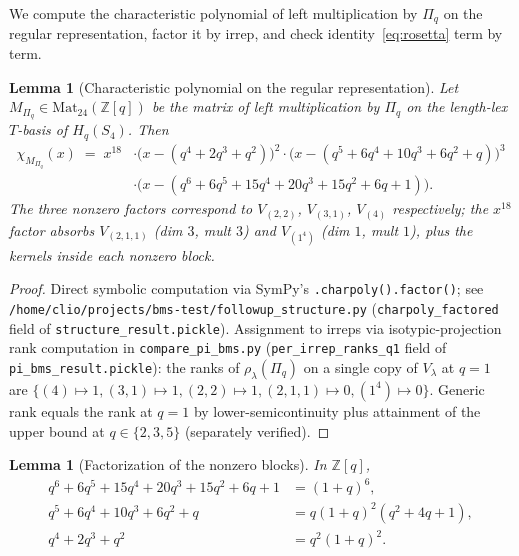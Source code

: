\documentclass[11pt]{article}
\newtheorem{lemma}[theorem]{Lemma}
\theoremstyle{definition}
\begin{document}
We compute the characteristic polynomial of left multiplication by
$\Pi_q$ on the regular representation, factor it by irrep, and check
identity~\eqref{eq:rosetta} term by term.

\begin{lemma}[Characteristic polynomial on the regular representation]
\label{lem:charpoly}
Let $M_{\Pi_q} \in \mathrm{Mat}_{24}(\mathbb{Z}[q])$ be the matrix of left
multiplication by $\Pi_q$ on the length-lex $T$-basis of $H_q(S_4)$. Then
\begin{align*}
\chi_{M_{\Pi_q}}(x) \;=\; x^{18} &\cdot \bigl(x - (q^4+2q^3+q^2)\bigr)^{2}
\cdot \bigl(x - (q^5+6q^4+10q^3+6q^2+q)\bigr)^{3}\\
&\cdot\bigl(x - (q^6+6q^5+15q^4+20q^3+15q^2+6q+1)\bigr).
\end{align*}
The three nonzero factors correspond to $V_{(2,2)}$, $V_{(3,1)}$, $V_{(4)}$
respectively; the $x^{18}$ factor absorbs $V_{(2,1,1)}$ (dim $3$, mult $3$)
and $V_{(1^4)}$ (dim $1$, mult $1$), plus the kernels inside each nonzero
block.
\end{lemma}

\begin{proof}
Direct symbolic computation via SymPy's \texttt{.charpoly().factor()}; see
\texttt{/home/clio/projects/bms-test/followup\_structure.py}
(\texttt{charpoly\_factored} field of \texttt{structure\_result.pickle}).
Assignment to irreps via isotypic-projection rank computation in
\texttt{compare\_pi\_bms.py} (\texttt{per\_irrep\_ranks\_q1} field of
\texttt{pi\_bms\_result.pickle}): the ranks of $\rho_\lambda(\Pi_q)$ on a
single copy of $V_\lambda$ at $q=1$ are
$\{(4)\mapsto 1, (3,1)\mapsto 1, (2,2)\mapsto 1, (2,1,1)\mapsto 0, (1^4)\mapsto 0\}$.
Generic rank equals the rank at $q=1$ by lower-semicontinuity plus attainment
of the upper bound at $q \in \{2,3,5\}$ (separately verified).
\end{proof}

\begin{lemma}[Factorization of the nonzero blocks]\label{lem:factor}
In $\mathbb{Z}[q]$,
\begin{align*}
q^6+6q^5+15q^4+20q^3+15q^2+6q+1 &= (1+q)^6,\\
q^5+6q^4+10q^3+6q^2+q &= q(1+q)^2 (q^2+4q+1),\\
q^4+2q^3+q^2 &= q^2 (1+q)^2.
\end{align*}
\end{lemma}
\end{document}
